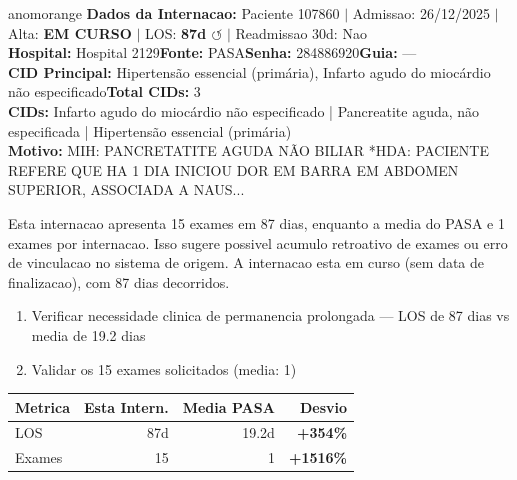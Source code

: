 \documentclass[a4paper,10pt]{article}
\begin{document}
\begin{anomalycard}[Internacao 179166 | PASA | ALTO (z=4.18)]{anomorange}
\textbf{Dados da Internacao:} Paciente 107860 $\mid$ Admissao: 26/12/2025 $\mid$ Alta: \textcolor{anomorange}{\textbf{EM CURSO}} $\mid$ LOS: \textbf{87d \textcolor{anomorange}{$\circlearrowleft$}} $\mid$ Readmissao 30d: Nao\\
\textbf{Hospital:} Hospital 2129\quad\textbf{Fonte:} PASA\quad\textbf{Senha:} 284886920\quad\textbf{Guia:} ---\\
\textbf{CID Principal:} {\small Hipertensão essencial (primária), Infarto agudo do miocárdio não especificado}\quad\textbf{Total CIDs:} 3\\

\textbf{CIDs:} {\scriptsize Infarto agudo do miocárdio não especificado | Pancreatite aguda, não especificada | Hipertensão essencial (primária)}\\

\textbf{Motivo:} {\scriptsize *MIH: PANCRETATITE AGUDA NÃO BILIAR *HDA: PACIENTE REFERE QUE HA 1 DIA INICIOU DOR EM BARRA EM ABDOMEN SUPERIOR, ASSOCIADA A NAUS...}\\

\vspace{2pt}\begin{tcolorbox}[colback=severityred!20,colframe=anomorange,title={\textbf{Interpretacao de Negocio}},fonttitle=\bfseries\small,left=4pt,right=4pt,top=3pt,bottom=3pt]
{\small Esta internacao apresenta 15 exames em 87 dias, enquanto a media do PASA e 1 exames por internacao. Isso sugere possivel acumulo retroativo de exames ou erro de vinculacao no sistema de origem. A internacao esta em curso (sem data de finalizacao), com 87 dias decorridos.}
\end{tcolorbox}
\begin{tcolorbox}[colback=severityyellow!30,colframe=anomorange,title={\textbf{Recomendacoes Especificas}},fonttitle=\bfseries\small,left=4pt,right=4pt,top=3pt,bottom=3pt]
\begin{enumerate}[nosep,leftmargin=16pt]
\item {\small Verificar necessidade clinica de permanencia prolongada --- LOS de 87 dias vs media de 19.2 dias}
\item {\small Validar os 15 exames solicitados (media: 1)}
\end{enumerate}
\end{tcolorbox}
\begin{center}\begin{tabular}{l r r r}\toprule\textbf{Metrica} & \textbf{Esta Intern.} & \textbf{Media PASA} & \textbf{Desvio} \\\midrule
LOS & 87d & 19.2d & \textcolor{anomred}{\textbf{+354\%}} \\
Exames & 15 & 1 & \textcolor{anomred}{\textbf{+1516\%}} \\
\bottomrule\end{tabular}\end{center}


\end{anomalycard}
\end{document}
